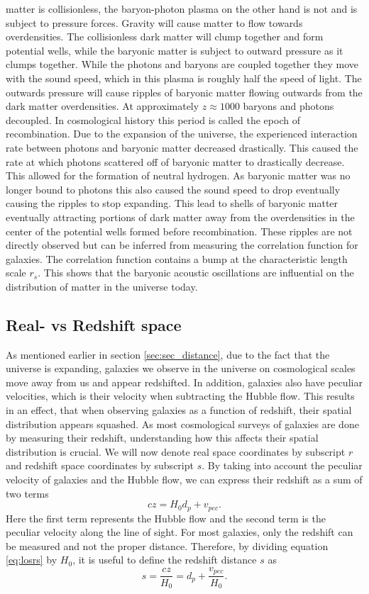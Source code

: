 matter is collisionless, the baryon-photon plasma on the other hand is not and
is subject to pressure forces. Gravity will cause matter to flow towards
overdensities. The collisionless dark matter will clump together and form
potential wells, while the baryonic matter is subject to outward pressure as it clumps
together. While the photons and baryons are coupled together they move with the
sound speed, which in this plasma is roughly half the speed of light. The
outwards pressure will cause ripples of baryonic matter flowing outwards from the
dark matter overdensities. At approximately $z\approx 1000$ baryons and photons
decoupled. In cosmological history this period is called the epoch of
recombination. Due to the expansion of the universe, the experienced interaction rate between
photons and baryonic matter decreased drastically. This caused the
rate at which photons scattered off of baryonic matter to drastically decrease. This allowed for the formation of neutral hydrogen.
As baryonic matter was no longer bound to photons this also caused the sound
speed to drop eventually causing the ripples to stop expanding. This lead to
shells of baryonic matter eventually attracting
portions of dark matter away from the overdensities in the center of the
potential wells formed before recombination. These ripples are not directly
observed but can be inferred from measuring the correlation function for
galaxies. The correlation function contains a bump at the characteristic length
scale $r_s$. This shows that the baryonic acoustic oscillations are influential on the distribution of
matter in the universe today.

\subsection{Real- vs Redshift space}
As mentioned earlier in section \ref{sec:sec_distance}, due to the fact that the
universe is expanding, galaxies we observe in the universe on cosmological scales
move away from us and appear redshifted. In addition, galaxies also have peculiar
velocities, which is their velocity when subtracting the Hubble flow. This results in an effect, that when observing galaxies
as a function of redshift, their spatial distribution appears squashed. As most
cosmological surveys of galaxies are done by measuring their redshift,
understanding how this affects their spatial distribution is crucial.
We will now denote real space coordinates by subscript $r$ and redshift space
coordinates by subscript $s$. By taking into account the peculiar velocity of
galaxies and the Hubble flow, we can express their redshift as a sum of two
terms
\begin{equation}\label{eq:losrs}
    cz=H_0d_p+v_{pec}.
\end{equation}
Here the first term represents the Hubble flow and the second term is the
peculiar velocity along the line of sight. For most galaxies, only the redshift
can be measured and not the proper distance. Therefore, by dividing equation
\ref{eq:losrs} by $H_0$, it is useful to define
the redshift distance $s$ as
\begin{equation}
    s = \frac{cz}{H_0}=d_p+\frac{v_{pec}}{H_0}.
\end{equation}
\\

